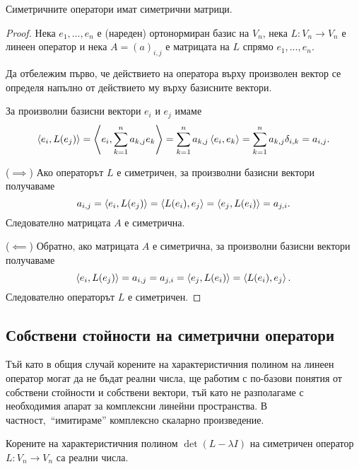 \documentclass[numbers=endperiod, DIV=15, bibliography=totocnumbered]{scrartcl}
\begin{document}
\begin{theorem}
  Симетричните оператори имат симетрични матрици.
\end{theorem}
\begin{proof}
  Нека $e_1, \ldots, e_n$ е (нареден) ортонормиран базис на $V_n$, нека $L: V_n \to V_n$ е линеен оператор и нека $A = {(a)}_{i,j}$ е матрицата на $L$ спрямо $e_1, \ldots, e_n$.

  Да отбележим първо, че действието на оператора върху произволен вектор се определя напълно от действието му върху базисните вектори.

  За произволни базисни вектори $e_i$ и $e_j$ имаме
  \begin{align*}
    \left\langle e_i, L(e_j) \right\rangle
    =
    \left\langle e_i, \sum_{k=1}^n a_{k,j} e_k \right\rangle
    =
    \sum_{k=1}^n a_{k,j} \left\langle e_i, e_k \right\rangle
    =
    \sum_{k=1}^n a_{k,j} \delta_{i,k}
    =
    a_{i,j}.
  \end{align*}

  ($\implies$) Ако операторът $L$ е симетричен, за произволни базисни вектори получаваме
  \begin{displaymath}
    a_{i,j}
    =
    \left\langle e_i, L(e_j) \right\rangle
    =
    \left\langle L(e_i), e_j \right\rangle
    =
    \left\langle e_j, L(e_i) \right\rangle
    =
    a_{j,i}.
  \end{displaymath}
  Следователно матрицата $A$ е симетрична.

  ($\impliedby$) Обратно, ако матрицата $A$ е симетрична, за произволни базисни вектори получаваме
  \begin{displaymath}
    \left\langle e_i, L(e_j) \right\rangle
    =
    a_{i,j}
    =
    a_{j,i}
    =
    \left\langle e_j, L(e_i) \right\rangle
    =
    \left\langle L(e_i), e_j \right\rangle.
  \end{displaymath}
  Следователно операторът $L$ е симетричен.
\end{proof}

\subsection{Собствени стойности на симетрични оператори}

Тъй като в общия случай корените на характеристичния полином на линеен оператор могат да не бъдат реални числа, ще работим с по-базови понятия от собствени стойности и собствени вектори, тъй като не разполагаме с необходимия апарат за комплексни линейни пространства. В частност,~\enquote{имитираме} комплексно скаларно произведение.

\begin{theorem}
  Корените на характеристичния полином $\det(L - \lambda I)$ на симетричен оператор $L:V_n \to V_n$ са реални числа.
\end{theorem}
\end{document}
